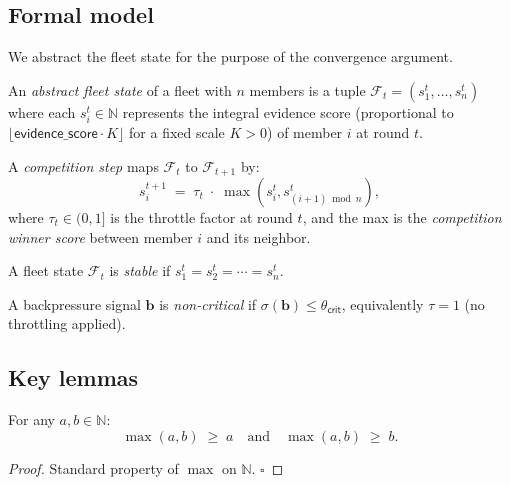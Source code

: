 \documentclass[11pt]{article}
\providecommand{\Fleet}{\mathcal{F}}               %
\providecommand{\instab}{\sigma}                   %
\providecommand{\throttlefactor}{\tau}             %
\providecommand{\Bsig}{\mathbf{b}}                  %
\begin{document}
\subsection{Formal model}

We abstract the fleet state for the purpose of the convergence argument.

\begin{definition}\label{def:abs-fleet}
An \emph{abstract fleet state} of a fleet with $n$ members is a tuple
$\Fleet_t = (s_1^t, \ldots, s_n^t)$ where each $s_i^t \in \mathbb{N}$
represents the integral evidence score (proportional to
$\lfloor \mathsf{evidence\_score} \cdot K \rfloor$ for a fixed scale $K > 0$)
of member $i$ at round $t$.
\end{definition}

\begin{definition}\label{def:comp-step}
A \emph{competition step} maps $\Fleet_t$ to $\Fleet_{t+1}$ by:
\[
  s_i^{t+1} \;=\; \throttlefactor_t \;\cdot\; \max(s_i^t, s_{(i+1)\bmod n}^t),
\]
where $\throttlefactor_t \in (0, 1]$ is the throttle factor at round $t$,
and the max is the \emph{competition winner score} between member $i$ and its
neighbor.
\end{definition}

\begin{definition}\label{def:stable}
A fleet state $\Fleet_t$ is \emph{stable} if $s_1^t = s_2^t = \cdots = s_n^t$.
\end{definition}

\begin{definition}\label{def:noncrit}
A backpressure signal $\Bsig$ is \emph{non-critical} if
$\instab(\Bsig) \leq \theta_{\mathsf{crit}}$, equivalently
$\throttlefactor = 1$ (no throttling applied).
\end{definition}

\subsection{Key lemmas}

\begin{lemma}\label{lem:comp-mono}
For any $a, b \in \mathbb{N}$:
\[
  \max(a, b) \;\geq\; a
  \quad\text{and}\quad
  \max(a, b) \;\geq\; b.
\]
\end{lemma}
\begin{proof}
Standard property of $\max$ on $\mathbb{N}$. \hfill$\square$
\end{proof}
\end{document}
